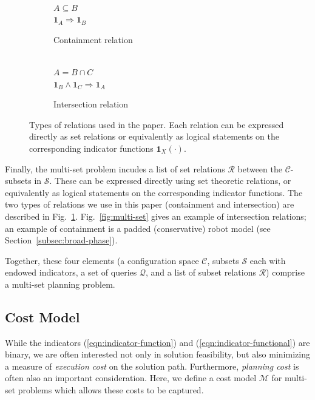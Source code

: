 \documentclass{report}
\begin{document}
\begin{figure}
\centering
\begin{subfigure}[t]{0.45\linewidth}
\centering
 \\
$A \subseteq B$ \\
$\mathbf{1}_A \Rightarrow \mathbf{1}_B$
\caption{Containment relation}
\end{subfigure}%
\quad\quad%
\begin{subfigure}[t]{0.45\linewidth}
\centering
 \\
$A = B \cap C$ \\
$\mathbf{1}_B \wedge \mathbf{1}_C \Rightarrow \mathbf{1}_A$
\caption{Intersection relation}
\end{subfigure}
\caption{Types of relations used in the paper.
  Each relation can be expressed directly as set relations
  or equivalently as logical statements
  on the corresponding indicator functions
  $\mathbf{1}_X(\cdot)$.}
\label{fig:relations}
\end{figure}

Finally, the multi-set problem incudes a list of set relations
$\mathcal{R}$
between the $\mathcal{C}$-subsets in $\mathcal{S}$.
These can be expressed directly using set theoretic relations,
or equivalently as logical statements
on the corresponding indicator functions.
The two types of relations we use in this paper
(containment and intersection)
are described in Fig.~\ref{fig:relations}.
Fig.~\ref{fig:multi-set} gives an example of intersection relations;
an example of containment is a padded (conservative)
robot model (see Section~\ref{subsec:broad-phase}).

Together, these four elements
(a configuration space $\mathcal{C}$,
subsets $\mathcal{S}$ each with endowed indicators,
a set of queries $\mathcal{Q}$,
and a list of subset relations $\mathcal{R}$)
comprise a multi-set planning problem.

\subsection{Cost Model}
\label{subsec:cost-model}

While the indicators
(\ref{eqn:indicator-function}) and (\ref{eqn:indicator-functional})
are binary,
we are often interested not only in solution feasibility,
but also minimizing a measure of \emph{execution cost}
on the solution path.
Furthermore,
\emph{planning cost} is often also an important consideration.
Here,
we define a cost model $\mathcal{M}$
for multi-set problems
which allows these costs to be captured.
\end{document}
